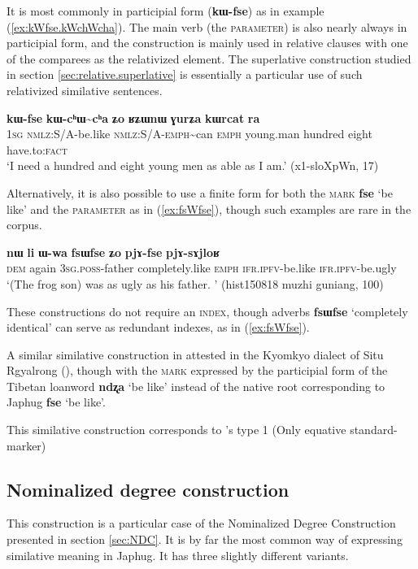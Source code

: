 \documentclass[oneside,a4paper,11pt]{article}
\newcommand{\ipa}[1]{{\phon\textbf{#1}}} %
\newcommand{\forme}[2]{\ipa{#1} `#2'}
\newcommand{\rdp}{\textasciitilde{}}
\begin{document}
It is most commonly in participial form (\ipa{kɯ-fse}) as in  example (\ref{ex:kWfse.kWchWcha}). The main verb (the \textsc{parameter}) is also nearly always in participial form, and the construction is mainly used in relative clauses with one of the comparees as the relativized element. The superlative construction studied in section \ref{sec:relative.superlative} is essentially a particular use of such relativized similative sentences.

\begin{exe}
\ex \label{ex:kWfse.kWchWcha}
\gll \ipa{aʑo} 	\ipa{kɯ-fse} 	\ipa{kɯ-cʰɯ\rdp{}cʰa} 	\ipa{ʑo} 	\ipa{ʁʑɯnɯ} 	\ipa{ɣurʑa} 	\ipa{kɯrcat} 	\ipa{ra}  \\
\textsc{1sg} \textsc{nmlz}:S/A-be.like \textsc{nmlz}:S/A-\textsc{emph}\rdp{}can \textsc{emph} young.man hundred eight have.to:\textsc{fact} \\
\glt `I need a hundred and eight young men as able as I am.' (x1-sloXpWn, 17)
\end{exe}

Alternatively, it is also possible to use a finite form for both the \textsc{mark} \forme{fse}{be like} and the \textsc{parameter} as in (\ref{ex:fsWfse}), though such examples are rare in the corpus.

\begin{exe}
\ex \label{ex:fsWfse}
\gll
\ipa{nɯ} 	\ipa{li} 	\ipa{ɯ-wa} 	\ipa{fsɯfse} 	\ipa{ʑo} 	\ipa{pjɤ-fse} 	\ipa{pjɤ-sɤjloʁ} \\
\textsc{dem} again \textsc{3sg.poss}-father completely.like \textsc{emph} \textsc{ifr.ipfv}-be.like \textsc{ifr.ipfv}-be.ugly \\
\glt `(The frog son) was as ugly as his father. ' (hist150818 muzhi guniang, 100)
\end{exe}

These constructions do not require an \textsc{index}, though adverbs \forme{fsɯfse}{completely identical} can serve as redundant indexes, as in (\ref{ex:fsWfse}).

A similar similative construction in attested in the Kyomkyo dialect of Situ Rgyalrong (\citealt[238]{prins11kyomkyo}), though with the \textsc{mark} expressed by the participial form of the Tibetan loanword \forme{ndʐa}{be like} instead of the native root corresponding to Japhug \forme{fse}{be like}.

This similative construction corresponds to \citealt{haspelmath17equative}'s type 1 (Only equative standard-marker)

\subsection{Nominalized degree construction} \label{sec:NDC.similative}
This construction is a particular case of the Nominalized Degree Construction presented in section \ref{sec:NDC}. It is by far the most common way of expressing similative meaning in Japhug. It has three slightly different variants. 
\end{document}
